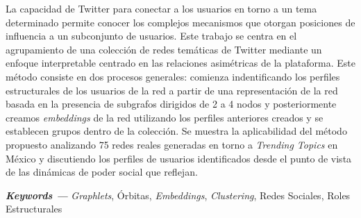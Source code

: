 \label{sec:Resumen}

La capacidad de Twitter para conectar a los usuarios en torno a un tema determinado permite conocer los complejos mecanismos que otorgan posiciones de influencia a un subconjunto de usuarios. Este trabajo se centra en el agrupamiento de una colección de redes temáticas de Twitter mediante un enfoque interpretable centrado en las relaciones asimétricas de la plataforma. Este método consiste en dos procesos generales: comienza indentificando los perfiles estructurales de los usuarios de la red a partir de una representación de la red basada en la presencia de subgrafos dirigidos de 2 a 4 nodos y posteriormente creamos \textit{embeddings} de la red utilizando los perfiles anteriores creados y se establecen grupos dentro de la colección. Se muestra la aplicabilidad del método propuesto analizando 75 redes reales generadas en torno a \textit{Trending Topics} en México y discutiendo los perfiles de usuarios identificados desde el punto de vista de las dinámicas de poder social que reflejan.

{\vspace{5mm}\textbf{\textit{Keywords ---}} \textit{Graphlets}, Órbitas, \textit{Embeddings}, \textit{Clustering}, Redes Sociales, Roles Estructurales} 



